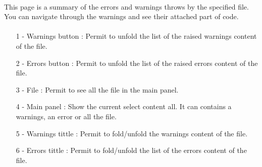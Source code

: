\documentclass{article}
\begin{document}
\paragraph{}

\vspace{\baselineskip}

\paragraph{}
This page is a summary of the errors and warnings throws by the specified file. You can navigate through the warnings and see their attached part of code.

\paragraph{}
\begin{itemize}
	\item[1 -] Warnings button : Permit to unfold the list of the raised warnings content of the file.
	\item[2 -] Errors button : Permit to unfold the list of the raised errors content of the file.
    \item[3 -] File : Permit to see all the file in the main panel.
    \item[4 -] Main panel : Show the current select content all. It can contains a warnings, an error or all the file.
    \item[5 -] Warnings tittle : Permit to fold/unfold the warnings content of the file.
    \item[6 -] Errors tittle : Permit to fold/unfold the list of the errors content of the file.
\end{itemize}
\end{document}
